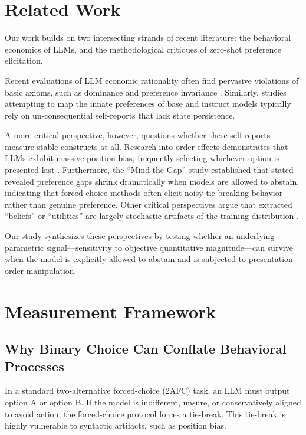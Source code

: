 \documentclass[10pt,journal,compsoc]{IEEEtran}
\begin{document}
\section{Related Work}
\label{sec:related_work}

Our work builds on two intersecting strands of recent literature: the behavioral economics of LLMs, and the methodological critiques of zero-shot preference elicitation.

Recent evaluations of LLM economic rationality often find pervasive violations of basic axioms, such as dominance and preference invariance \cite{innate_econ_preferences_2026}. Similarly, studies attempting to map the innate preferences of base and instruct models \cite{what_do_llms_want_2024, probing_preferences_2024} typically rely on un-consequential self-reports that lack state persistence.

A more critical perspective, however, questions whether these self-reports measure stable constructs at all. Research into order effects demonstrates that LLMs exhibit massive position bias, frequently selecting whichever option is presented last \cite{fragile_preferences_2026}. Furthermore, the ``Mind the Gap'' study \cite{mind_the_gap_2026} established that stated-revealed preference gaps shrink dramatically when models are allowed to abstain, indicating that forced-choice methods often elicit noisy tie-breaking behavior rather than genuine preference. Other critical perspectives argue that extracted ``beliefs'' or ``utilities'' are largely stochastic artifacts of the training distribution \cite{randomness_not_rep_2026, alignment_revisited_2026}.

Our study synthesizes these perspectives by testing whether an underlying parametric signal---sensitivity to objective quantitative magnitude---can survive when the model is explicitly allowed to abstain and is subjected to presentation-order manipulation.

\section{Measurement Framework}
\label{sec:framework}

\subsection{Why Binary Choice Can Conflate Behavioral Processes}
In a standard two-alternative forced-choice (2AFC) task, an LLM must output option A or option B. If the model is indifferent, unsure, or conservatively aligned to avoid action, the forced-choice protocol forces a tie-break. This tie-break is highly vulnerable to syntactic artifacts, such as position bias. 
\end{document}
